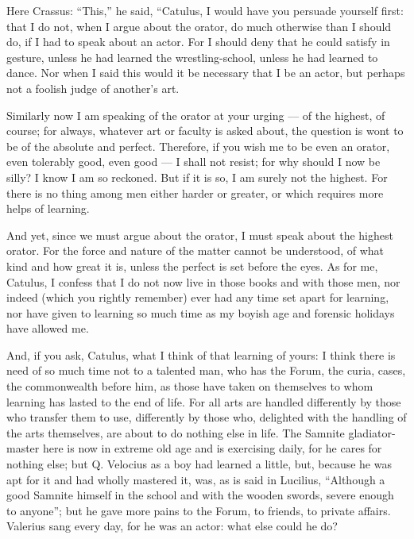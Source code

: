  Here Crassus: ``This,'' he said, ``Catulus, I would have you persuade yourself first: that I do not, when I argue about the orator, do much otherwise than I should do, if I had to speak about an actor. For I should deny that he could satisfy in gesture, unless he had learned the wrestling-school, unless he had learned to dance. Nor when I said this would it be necessary that I be an actor, but perhaps not a foolish judge of another's art.

 Similarly now I am speaking of the orator at your urging — of the highest, of course; for always, whatever art or faculty is asked about, the question is wont to be of the absolute and perfect. Therefore, if you wish me to be even an orator, even tolerably good, even good — I shall not resist; for why should I now be silly? I know I am so reckoned. But if it is so, I am surely not the highest. For there is no thing among men either harder or greater, or which requires more helps of learning.

 And yet, since we must argue about the orator, I must speak about the highest orator. For the force and nature of the matter cannot be understood, of what kind and how great it is, unless the perfect is set before the eyes. As for me, Catulus, I confess that I do not now live in those books and with those men, nor indeed (which you rightly remember) ever had any time set apart for learning, nor have given to learning so much time as my boyish age and forensic holidays have allowed me.

 And, if you ask, Catulus, what I think of that learning of yours: I think there is need of so much time not to a talented man, who has the Forum, the curia, cases, the commonwealth before him, as those have taken on themselves to whom learning has lasted to the end of life. For all arts are handled differently by those who transfer them to use, differently by those who, delighted with the handling of the arts themselves, are about to do nothing else in life. The Samnite gladiator-master here is now in extreme old age and is exercising daily, for he cares for nothing else; but Q. Velocius as a boy had learned a little, but, because he was apt for it and had wholly mastered it, was, as is said in Lucilius, ``Although a good Samnite himself in the school and with the wooden swords, severe enough to anyone''; but he gave more pains to the Forum, to friends, to private affairs. Valerius sang every day, for he was an actor: what else could he do?

